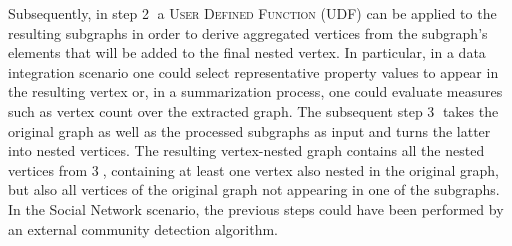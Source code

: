 %
Subsequently, in step \textcircled{\raisebox{-.5pt}2} a \textsc{User Defined Function} (UDF) can be applied to the resulting subgraphs in order to derive aggregated vertices from the subgraph's elements that will be added to the final nested vertex. In particular, in a data integration scenario one could select representative property values to appear in the resulting vertex or, in a summarization process, one could evaluate measures such as vertex count over the extracted graph. The subsequent step \textcircled{\raisebox{-.5pt}3} takes the original graph as well as the processed subgraphs as input and turns the latter into nested vertices. The resulting vertex-nested graph contains all the nested vertices from \textcircled{\raisebox{-.5pt}3}, containing at least one vertex also nested in the original graph, but also all vertices of the original graph not appearing in one of the subgraphs. In the Social Network scenario, the previous steps could have been performed by an external community detection algorithm. 

